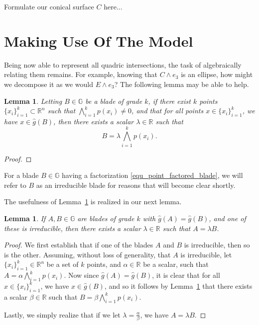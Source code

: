 \documentclass{birkjour}
\newtheorem{lem}[thm]{Lemma}
\theoremstyle{definition}
\theoremstyle{remark}
\numberwithin{equation}{section}
\newcommand{\R}{\mathbb{R}}
\newcommand{\G}{\mathbb{G}}
\newcommand{\gh}{\hat{g}}
\begin{document}
Formulate our conical surface $C$ here...

\section{Making Use Of The Model}

Being now able to represent all quadric intersections, the task of
algebraically relating them remains.  For example, knowing that
$C\wedge e_3$ is an ellipse, how might we decompose it
as we would $E\wedge e_3$?  The following lemma may be able to help.
\begin{lem}\label{lma_point_factored_blade}
Letting $B\in\G$ be a blade of grade $k$, if there exist $k$ points $\{x_i\}_{i=1}^k\subset\R^n$
such that $\bigwedge_{i=1}^k p(x_i)\neq 0$, and that for all points
$x\in\{x_i\}_{i=1}^k$, we have $x\in\gh(B)$, then there exists a scalar $\lambda\in\R$
such that
\begin{equation}\label{equ_point_factored_blade}
B = \lambda\bigwedge_{i=1}^k p(x_i).
\end{equation}
\end{lem}
\begin{proof}
\end{proof}
For a blade $B\in\G$ having a factorization \eqref{equ_point_factored_blade},
we will refer to $B$ as an irreducible blade for reasons that will become clear shortly.

The usefulness of Lemma~\ref{lma_point_factored_blade} is realized in our next lemma.
\begin{lem}\label{lma_equating_blades}
If $A,B\in\G$ are blades of grade $k$ with $\gh(A)=\gh(B)$, and one of these is irreducible,
then there exists a scalar $\lambda\in\R$ such that $A=\lambda B$.
\end{lem}
\begin{proof}
We first establish that if one of the blades $A$ and $B$ is irreducible, then so is the other.
Assuming, without loss of generality, that $A$ is irreducible, let $\{x_i\}_{i=1}^k\in\R^n$
be a set of $k$ points, and $\alpha\in\R$ be a scalar, such that $A=\alpha\bigwedge_{i=1}^k p(x_i)$.
Now since $\gh(A)=\gh(B)$, it is clear that for all $x\in\{x_i\}_{i=1}^k$, we have $x\in\gh(B)$,
and so it follows by Lemma~\ref{lma_point_factored_blade} that there exists a scalar $\beta\in\R$
such that $B=\beta\bigwedge_{i=1}^k p(x_i)$.

Lastly, we simply realize that if we let $\lambda=\frac{\alpha}{\beta}$, we have
$A=\lambda B$.
\end{proof}
\end{document}
